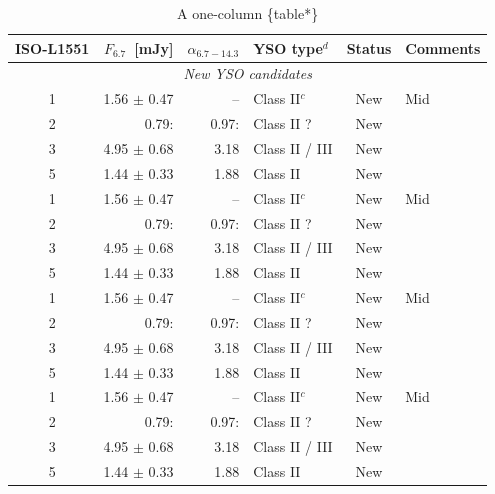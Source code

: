 \documentclass{aa}
\begin{document}
\begin{appendix}
\begin{table}[ht!]
		\caption {A one-column \{table*\} \newline}
		\label{table:2}
		\centering
		\begin{tabular}{crrlcl}
			\hline\hline
			ISO-L1551 & $F_{6.7}$~[mJy]  & $\alpha_{6.7-14.3}$
			          & YSO type$^{d}$   & Status              & Comments                                             \\
			\hline
			\multicolumn{6}{c}{\it New YSO candidates}                                                                \\ %
			\hline
			1         & 1.56 $\pm$ 0.47  & --                  & Class II$^{c}$ & New            & Mid                \\
			2         & 0.79:            & 0.97:               & Class II ?     & New            &                    \\
			3         & 4.95 $\pm$ 0.68  & 3.18                & Class II / III & New            &                    \\
			5         & 1.44 $\pm$ 0.33  & 1.88                & Class II       & New            &                    \\
			1         & 1.56 $\pm$ 0.47  & --                  & Class II$^{c}$ & New            & Mid                \\
			2         & 0.79:            & 0.97:               & Class II ?     & New            &                    \\
			3         & 4.95 $\pm$ 0.68  & 3.18                & Class II / III & New            &                    \\
			5         & 1.44 $\pm$ 0.33  & 1.88                & Class II       & New            &                    \\
			1         & 1.56 $\pm$ 0.47  & --                  & Class II$^{c}$ & New            & Mid                \\
			2         & 0.79:            & 0.97:               & Class II ?     & New            &                    \\
			3         & 4.95 $\pm$ 0.68  & 3.18                & Class II / III & New            &                    \\
			5         & 1.44 $\pm$ 0.33  & 1.88                & Class II       & New            &                    \\
			1         & 1.56 $\pm$ 0.47  & --                  & Class II$^{c}$ & New            & Mid                \\
			2         & 0.79:            & 0.97:               & Class II ?     & New            &                    \\
			3         & 4.95 $\pm$ 0.68  & 3.18                & Class II / III & New            &                    \\
			5         & 1.44 $\pm$ 0.33  & 1.88                & Class II       & New            &                    \\


\end{tabular}
\end{table}
\end{appendix}
\end{document}

